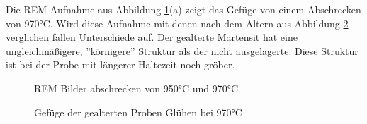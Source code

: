 \documentclass[a4paper, 11pt]{tubsreprt}
\begin{document}
Die REM Aufnahme aus Abbildung \ref{REM 970C und 950C}(a) zeigt das Gefüge von einem Abschrecken von 970°C. Wird diese Aufnahme mit denen nach dem Altern aus Abbildung \ref{REM 970C auslagerung} verglichen fallen Unterschiede auf. Der gealterte Martensit hat eine ungleichmäßigere, ''körnigere''  Struktur als der nicht ausgelagerte. Diese Struktur ist bei der Probe mit längerer Haltezeit noch gröber. 
\begin{figure}
\caption{REM Bilder abschrecken von 950°C und 970°C}
\label{REM 970C und 950C}
\end{figure}


\begin{figure}
\caption{Gefüge der gealterten Proben Glühen bei 970°C}
\label{REM 970C auslagerung}
\end{figure}
\end{document}

